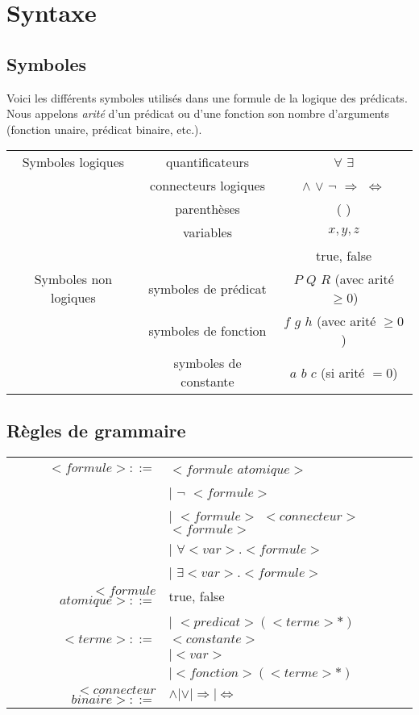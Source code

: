 \section{Syntaxe}

\subsection{Symboles}

Voici les différents symboles utilisés dans une formule de la logique des prédicats.
Nous appelons {\em arité} d'un prédicat ou d'une fonction son nombre d'arguments
(fonction unaire, prédicat binaire, etc.).

\begin{tabular}{|c|c|c|}
	\hline
	Symboles logiques & quantificateurs & $\forall$ $\exists$ \\
	                  & connecteurs logiques & $\wedge$ $\vee$ $\neg$ $\Rightarrow$ $\Leftrightarrow$ \\
	                  & parenthèses & ( ) \\
	                  & variables & $x, y, z$ \\
	                  & & true, false\\
	\hline
	Symboles non logiques & symboles de prédicat & $P$ $Q$ $R$ (avec arité $\geq 0$) \\
	   		      & symboles de fonction & $f$ $g$ $h$ (avec arité $\geq 0$) \\
	   		      & symboles de constante & $a$ $b$ $c$ (si arité $= 0$) \\
	\hline
\end{tabular}

\subsection{Règles de grammaire}
\begin{tabular}{rl}
$<formule>::=$ 	  &	$<formule$ $atomique>$ \\
				  & $\vert$ $\neg$ $<formule>$ \\
				  & $\vert$ $<formule>$ $<connecteur>$ $<formule>$ \\
				  & $\vert$ $\forall <var>.<formule>$ \\
				  & $\vert$ $\exists <var>.<formule>$ \\
$<formule$ $atomique>::=$ 
				  & true, false \\
				  & $\vert$ $<predicat>(<terme>*)$ \\
$<terme>::=$	  & $<constante>$ \\
				  & $\vert <var>$ \\
				  & $\vert <fonction>(<terme>*)$ \\
$<connecteur$ $binaire>::=$ 
				  & $\wedge \vert \vee \vert \Rightarrow \vert \Leftrightarrow$ \\

\end{tabular}

